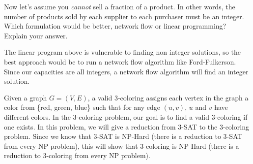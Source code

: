 \documentclass[11pt]{article}
\begin{document}
\begin{subparts}
\subpart Now let's assume you \textit{cannot} sell a fraction of a product.
In other words, the number of products sold by each supplier to
each purchaser must be an integer.
Which formulation would be better, network flow or linear programming?
Explain your answer.
\begin{solution}
    The linear program above is vulnerable to finding non integer solutions, so the best approach would be to run a network flow algorithm like Ford-Fulkerson.
    Since our capacities are all integers, a network flow algorithm will find an integer solution.
\end{solution}
\end{subparts}

\newpage
{}

Given a graph $G = (V, E)$, a valid 3-coloring assigns each vertex in the graph a color from \{red, green, blue\} such that for any edge $(u, v)$, $u$ and $v$ have different colors. In the 3-coloring problem, our goal is to find a valid 3-coloring if one exists. In this problem, we will give a reduction from 3-SAT to the 3-coloring problem. Since we know that 3-SAT is NP-Hard (there is a reduction to 3-SAT from every NP problem), this will show that 3-coloring is NP-Hard (there is a reduction to 3-coloring from every NP problem).
\end{document}
